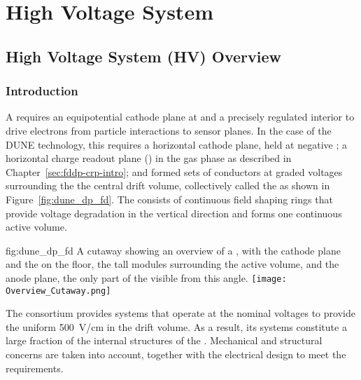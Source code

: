 \chapter{High Voltage System}
\label{ch:fddp-hv}

\section{High Voltage System (HV) Overview}
\label{sec:fddp-hv-ov}


\subsection{Introduction}
\label{sec:fddp-hv-intro}

A  requires an equipotential cathode plane at  and a precisely regulated interior \efield to drive 
electrons from particle interactions to sensor planes.  In the case of the DUNE  technology, 
this requires a horizontal cathode plane, held at negative ; a horizontal charge readout plane () in the gas phase as described in  Chapter~\ref{sec:fddp-crp-intro}; and formed sets of conductors at graded voltages surrounding the
 the central drift volume, collectively called the  as shown in Figure~\ref{fig:dune_dp_fd}. The  consists of continuous field shaping rings that provide voltage degradation in the vertical direction and forms one continuous active volume.


\begin{dunefigure}{fig:dune_dp_fd}
{A cutaway showing an overview of a , with the cathode plane and the  on the floor, the \tpcheight tall  modules surrounding the active volume, and the anode plane, the only part of the  visible from this angle.}
\texttt{[image: Overview\_Cutaway.png]}
\end{dunefigure}

The  consortium provides systems that operate at the nominal voltages to provide the uniform \SI{500}{V/cm} \efield in the  drift volume. As a result, its systems %
constitute a large fraction of the %
internal structures of the . %
Mechanical and structural concerns are taken into account, together with the electrical design to meet the requirements. 

